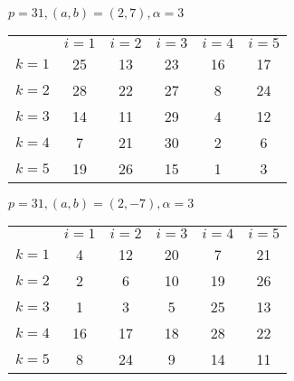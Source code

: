 \documentclass[12pt]{article}
\begin{document}
$p = 31, (a,b) = (2, 7), \alpha = 3$ \vspace{5mm}

\begin{tabular}{ c | c | c | c | c | c }
        & $i=1$ & $i=2$ & $i=3$ & $i=4$ & $i=5$ \\
  $k=1$ &   25  &   13  &   23  &   16  &   17  \\
  $k=2$ &   28  &   22  &   27  &    8  &   24  \\
  $k=3$ &   14  &   11  &   29  &    4  &   12  \\
  $k=4$ &   7   &   21  &   30  &    2  &    6  \\
  $k=5$ &   19  &   26  &   15  &    1  &    3  \\ 
\end{tabular} \vspace{5mm}

$p = 31, (a,b) = (2, -7), \alpha = 3$\vspace{5mm}

\begin{tabular}{ c | c | c | c | c | c }
        & $i=1$ & $i=2$ & $i=3$ & $i=4$ & $i=5$ \\
  $k=1$ &   4   &   12  &   20  &   7   &   21  \\
  $k=2$ &   2   &    6  &   10  &   19  &   26  \\
  $k=3$ &   1   &    3  &   5   &   25  &   13  \\
  $k=4$ &   16  &   17  &   18  &   28  &   22  \\
  $k=5$ &   8   &   24  &   9   &   14  &   11  \\ 
\end{tabular} 
\end{document}
